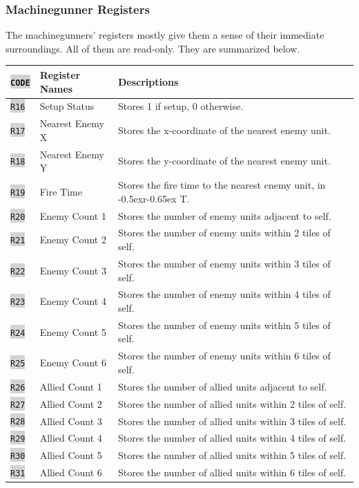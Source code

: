 \documentclass{article}
\newcommand{\vnscode}[1]{\colorbox{lightgray}{\lstinline[language=vns]{#1}}}
\newcommand{\RT}{\lower-0.5ex\hbox{r}\kern-0.65ex T}
\begin{document}
\subsubsection{Machinegunner Registers}

The machinegunners' registers mostly give them a sense of their immediate
surroundings. All of them are read-only. They are summarized below.

\begin{minipage}{\textwidth}
\centering
\begin{tabular}{lll}
    \hline \vnscode{CODE} & Register Names & Descriptions \\ \hline
    \vnscode{R16} & Setup Status & Stores 1 if setup, 0 otherwise. \\
    \vnscode{R17} & Nearest Enemy X & Stores the x-coordinate of the nearest enemy unit. \\
    \vnscode{R18} & Nearest Enemy Y & Stores the y-coordinate of the nearest enemy unit. \\
    \vnscode{R19} & Fire Time & Stores the fire time to the nearest enemy unit, in \RT. \\
    \vnscode{R20} & Enemy Count 1 & Stores the number of enemy units adjacent to self. \\
    \vnscode{R21} & Enemy Count 2 & Stores the number of enemy units within 2 tiles of self. \\
    \vnscode{R22} & Enemy Count 3 & Stores the number of enemy units within 3 tiles of self. \\
    \vnscode{R23} & Enemy Count 4 & Stores the number of enemy units within 4 tiles of self. \\
    \vnscode{R24} & Enemy Count 5 & Stores the number of enemy units within 5 tiles of self. \\
    \vnscode{R25} & Enemy Count 6 & Stores the number of enemy units within 6 tiles of self. \\
    \vnscode{R26} & Allied Count 1 & Stores the number of allied units adjacent to self. \\
    \vnscode{R27} & Allied Count 2 & Stores the number of allied units within 2 tiles of self. \\
    \vnscode{R28} & Allied Count 3 & Stores the number of allied units within 3 tiles of self. \\
    \vnscode{R29} & Allied Count 4 & Stores the number of allied units within 4 tiles of self. \\
    \vnscode{R30} & Allied Count 5 & Stores the number of allied units within 5 tiles of self. \\
    \vnscode{R31} & Allied Count 6 & Stores the number of allied units within 6 tiles of self. \\
\end{tabular}
\end{minipage}
\end{document}
